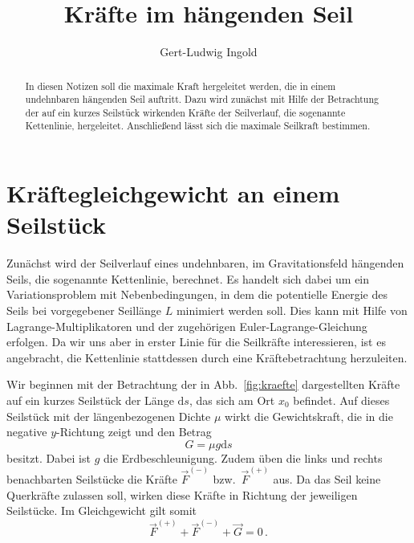 \documentclass[twocolumn,aps]{revtex4}
\begin{document}
\title{Kräfte im hängenden Seil}
\author{Gert-Ludwig Ingold}
\begin{abstract}
 In diesen Notizen soll die maximale Kraft hergeleitet werden, die in
 einem undehnbaren hängenden Seil auftritt. Dazu wird zunächst
 mit Hilfe der Betrachtung der auf ein kurzes Seilstück
 wirkenden Kräfte der Seilverlauf, die sogenannte Kettenlinie,
 hergeleitet. Anschließend lässt sich die maximale Seilkraft
 bestimmen.
\end{abstract}
\maketitle

\section{Kräftegleichgewicht an einem Seilstück}
Zunächst wird der Seilverlauf eines undehnbaren, im Gravitationsfeld
hängenden Seils, die sogenannte Kettenlinie, berechnet. Es handelt
sich dabei um ein Variationsproblem mit Nebenbedingungen, in dem die
potentielle Energie des Seils bei vorgegebener Seillänge $L$ minimiert
werden soll. Dies kann mit Hilfe von Lagrange-Multiplikatoren und der
zugehörigen Euler-Lagrange-Gleichung erfolgen. Da wir uns aber in
erster Linie für die Seilkräfte interessieren, ist es angebracht, die
Kettenlinie stattdessen durch eine Kräftebetrachtung herzuleiten.

Wir beginnen mit der Betrachtung der in Abb.~\ref{fig:kraefte}
dargestellten Kräfte auf ein kurzes Seilstück der Länge $\mathrm{d}s$,
das sich am Ort $x_0$ befindet. Auf dieses Seilstück mit der
längenbezogenen Dichte $\mu$ wirkt die Gewichtskraft, die in die
negative $y$-Richtung zeigt und den Betrag
\begin{equation}
 G = \mu g\mathrm{d}s
\end{equation}
besitzt. Dabei ist $g$ die Erdbeschleunigung. Zudem üben die links und
rechts benachbarten Seilstücke die Kräfte $\vec F^{(-)}$ bzw.\ $\vec
F^{(+)}$ aus. Da das Seil keine Querkräfte zulassen soll, wirken diese
Kräfte in Richtung der jeweiligen Seilstücke. Im Gleichgewicht gilt
somit
\begin{equation}
 \vec F^{(+)}+\vec F^{(-)}+\vec G = 0\,.
 \label{eq:kraftgleichgewicht}
\end{equation}
\end{document}
